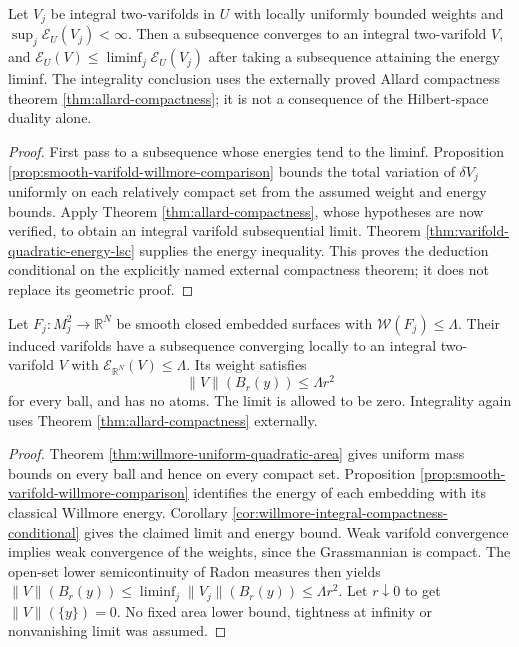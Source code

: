 \begin{corollary}\label{cor:willmore-integral-compactness-conditional}
Let $V_j$ be integral two-varifolds in $U$ with locally uniformly bounded weights and $\sup_j\mathcal E_U(V_j)<\infty$. Then a subsequence converges to an integral two-varifold $V$, and
$\mathcal E_U(V)\leq\liminf_j\mathcal E_U(V_j)$ after taking a subsequence attaining the energy liminf. The integrality conclusion uses the externally proved Allard compactness theorem \ref{thm:allard-compactness}; it is not a consequence of the Hilbert-space duality alone.
\end{corollary}
\begin{proof}
First pass to a subsequence whose energies tend to the liminf. Proposition \ref{prop:smooth-varifold-willmore-comparison} bounds the total variation of $\delta V_j$ uniformly on each relatively compact set from the assumed weight and energy bounds. Apply Theorem \ref{thm:allard-compactness}, whose hypotheses are now verified, to obtain an integral varifold subsequential limit. Theorem \ref{thm:varifold-quadratic-energy-lsc} supplies the energy inequality. This proves the deduction conditional on the explicitly named external compactness theorem; it does not replace its geometric proof.
\end{proof}

\begin{corollary}\label{cor:closed-surfaces-willmore-compactness}
Let $F_j:M_j^2\to\mathbb R^N$ be smooth closed embedded surfaces with $\mathcal W(F_j)\leq\Lambda$. Their induced varifolds have a subsequence converging locally to an integral two-varifold $V$ with $\mathcal E_{\mathbb R^N}(V)\leq\Lambda$. Its weight satisfies
\[
 \|V\|(B_r(y))\leq\Lambda r^2
\]
for every ball, and has no atoms. The limit is allowed to be zero. Integrality again uses Theorem \ref{thm:allard-compactness} externally.
\end{corollary}
\begin{proof}
Theorem \ref{thm:willmore-uniform-quadratic-area} gives uniform mass bounds on every ball and hence on every compact set. Proposition \ref{prop:smooth-varifold-willmore-comparison} identifies the energy of each embedding with its classical Willmore energy. Corollary \ref{cor:willmore-integral-compactness-conditional} gives the claimed limit and energy bound. Weak varifold convergence implies weak convergence of the weights, since the Grassmannian is compact. The open-set lower semicontinuity of Radon measures then yields
$\|V\|(B_r(y))\leq\liminf_j\|V_j\|(B_r(y))\leq\Lambda r^2$.
Let $r\downarrow0$ to get $\|V\|(\{y\})=0$. No fixed area lower bound, tightness at infinity or nonvanishing limit was assumed.
\end{proof}
